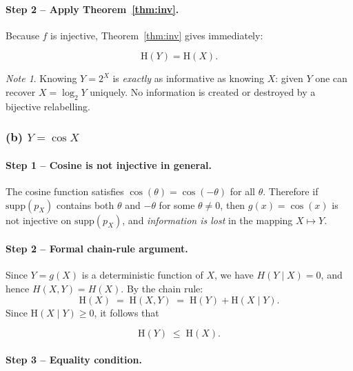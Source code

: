 \documentclass[12pt,a4paper]{article}
\theoremstyle{plain}
\theoremstyle{definition}
\theoremstyle{remark}
\newtheorem*{note}{Note}
\newcommand{\HH}{\mathrm{H}}
\newcommand{\supp}{\mathrm{supp}}
\begin{document}
\paragraph{Step 2 – Apply Theorem~\ref{thm:inv}.}

Because $f$ is injective, Theorem~\ref{thm:inv} gives immediately:

\begin{resultbox}
\[
  \boxed{\HH(Y) = \HH(X).}
\]
\end{resultbox}

\begin{note}
Knowing $Y = 2^X$ is \emph{exactly} as informative as knowing $X$: given $Y$
one can recover $X = \log_2 Y$ uniquely. No information is created or destroyed
by a bijective relabelling.
\end{note}

\subsubsection*{(b) $Y = \cos X$}

\paragraph{Step 1 – Cosine is not injective in general.}

The cosine function satisfies $\cos(\theta) = \cos(-\theta)$ for all $\theta$.
Therefore if $\supp(p_X)$ contains both $\theta$ and $-\theta$ for some
$\theta\neq 0$, then $g(x)=\cos(x)$ is not injective on $\supp(p_X)$, and
\emph{information is lost} in the mapping $X\mapsto Y$.

\paragraph{Step 2 – Formal chain-rule argument.}

Since $Y = g(X)$ is a deterministic function of $X$, we have $H(Y\mid X)=0$,
and hence $H(X,Y)=H(X)$.  By the chain rule:
\[
  \HH(X) \;=\; \HH(X,Y) \;=\; \HH(Y) + \HH(X \mid Y).
\]
Since $\HH(X\mid Y) \ge 0$, it follows that

\begin{resultbox}
\[
  \boxed{\HH(Y) \;\le\; \HH(X).}
\]
\end{resultbox}

\paragraph{Step 3 – Equality condition.}
\end{document}
